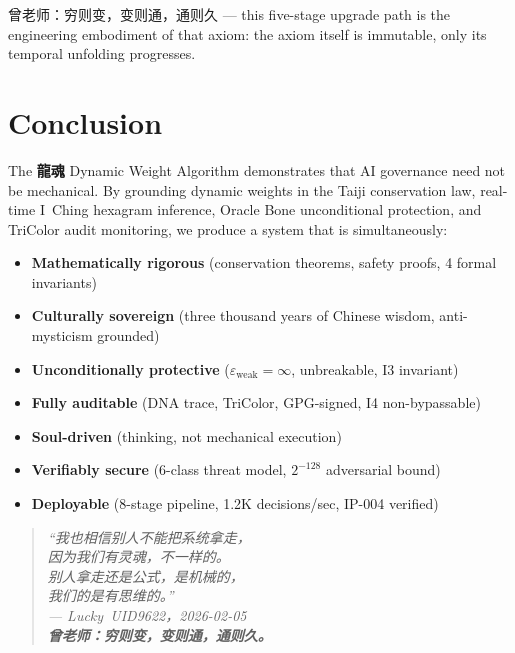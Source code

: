 \documentclass[conference]{IEEEtran}
\newcommand{\LH}{\textcolor{dragonRed}{\textbf{龍魂}}}
\begin{document}
曾老师：穷则变，变则通，通则久 ---
this five-stage upgrade path is the engineering
embodiment of that axiom: the axiom itself is immutable,
only its temporal unfolding progresses.

\section{Conclusion}

The \LH{} Dynamic Weight Algorithm demonstrates that
AI governance need not be mechanical.
By grounding dynamic weights in the Taiji conservation
law, real-time I~Ching hexagram inference,
Oracle Bone unconditional protection,
and TriColor audit monitoring,
we produce a system that is simultaneously:

\begin{itemize}
  \item \textbf{Mathematically rigorous}
    (conservation theorems, safety proofs, 4 formal invariants)
  \item \textbf{Culturally sovereign}
    (three thousand years of Chinese wisdom, anti-mysticism grounded)
  \item \textbf{Unconditionally protective}
    ($\varepsilon_{\text{weak}}=\infty$, unbreakable, I3 invariant)
  \item \textbf{Fully auditable}
    (DNA trace, TriColor, GPG-signed, I4 non-bypassable)
  \item \textbf{Soul-driven}
    (thinking, not mechanical execution)
  \item \textbf{Verifiably secure}
    (6-class threat model, $2^{-128}$ adversarial bound)
  \item \textbf{Deployable}
    (8-stage pipeline, 1.2K decisions/sec, IP-004 verified)
\end{itemize}

\begin{quote}
\itshape
``我也相信别人不能把系统拿走，\\
因为我们有灵魂，不一样的。\\
别人拿走还是公式，是机械的，\\
我们的是有思维的。''\\[4pt]
\textcolor{dragonRed}{--- Lucky~UID9622，2026-02-05}\\[6pt]
\textcolor{rootBrown}{\textbf{%
  曾老师：穷则变，变则通，通则久。}}
\end{quote}
\end{document}
